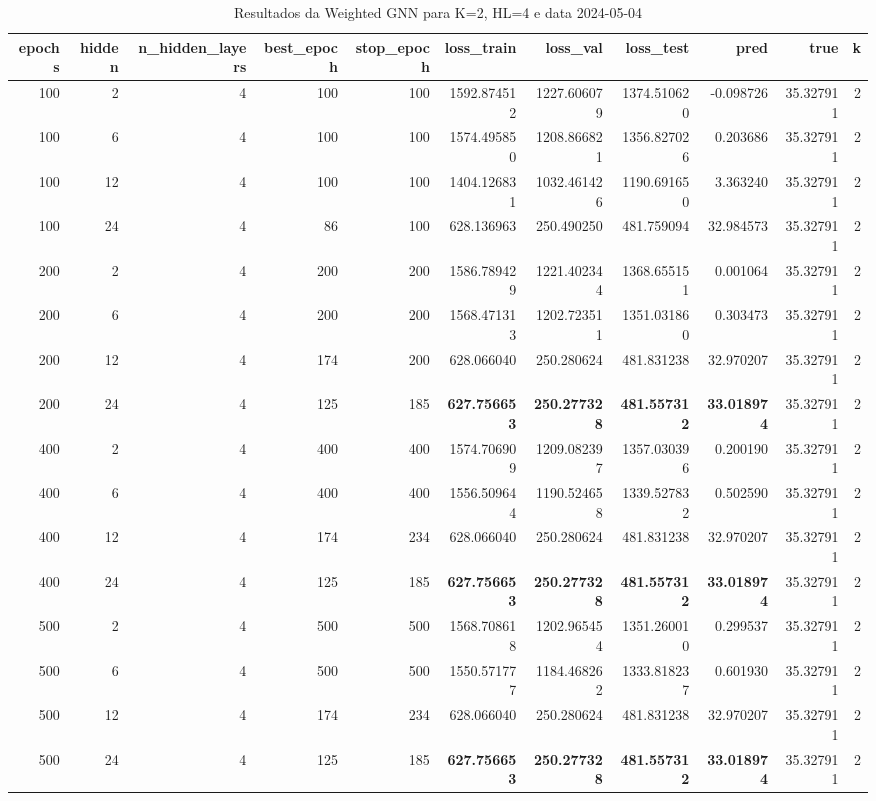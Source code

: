 \begin{table}
\caption{Resultados da Weighted GNN para K=2, HL=4 e data 2024-05-04}
\label{tab:weighted_gnn_results_k2_hl4_d20240504}
\begin{tabular}{rrrrrrrrrrr}
\toprule
epochs & hidden & n\_hidden\_layers & best\_epoch & stop\_epoch & loss\_train & loss\_val & loss\_test & pred & true & k \\
\midrule
100 & 2 & 4 & 100 & 100 & 1592.874512 & 1227.606079 & 1374.510620 & -0.098726 & 35.327911 & 2 \\
100 & 6 & 4 & 100 & 100 & 1574.495850 & 1208.866821 & 1356.827026 & 0.203686 & 35.327911 & 2 \\
100 & 12 & 4 & 100 & 100 & 1404.126831 & 1032.461426 & 1190.691650 & 3.363240 & 35.327911 & 2 \\
100 & 24 & 4 & 86 & 100 & 628.136963 & 250.490250 & 481.759094 & 32.984573 & 35.327911 & 2 \\
200 & 2 & 4 & 200 & 200 & 1586.789429 & 1221.402344 & 1368.655151 & 0.001064 & 35.327911 & 2 \\
200 & 6 & 4 & 200 & 200 & 1568.471313 & 1202.723511 & 1351.031860 & 0.303473 & 35.327911 & 2 \\
200 & 12 & 4 & 174 & 200 & 628.066040 & 250.280624 & 481.831238 & 32.970207 & 35.327911 & 2 \\
200 & 24 & 4 & 125 & 185 & \textbf{627.756653} & \textbf{250.277328} & \textbf{481.557312} & \textbf{33.018974} & 35.327911 & 2 \\
400 & 2 & 4 & 400 & 400 & 1574.706909 & 1209.082397 & 1357.030396 & 0.200190 & 35.327911 & 2 \\
400 & 6 & 4 & 400 & 400 & 1556.509644 & 1190.524658 & 1339.527832 & 0.502590 & 35.327911 & 2 \\
400 & 12 & 4 & 174 & 234 & 628.066040 & 250.280624 & 481.831238 & 32.970207 & 35.327911 & 2 \\
400 & 24 & 4 & 125 & 185 & \textbf{627.756653} & \textbf{250.277328} & \textbf{481.557312} & \textbf{33.018974} & 35.327911 & 2 \\
500 & 2 & 4 & 500 & 500 & 1568.708618 & 1202.965454 & 1351.260010 & 0.299537 & 35.327911 & 2 \\
500 & 6 & 4 & 500 & 500 & 1550.571777 & 1184.468262 & 1333.818237 & 0.601930 & 35.327911 & 2 \\
500 & 12 & 4 & 174 & 234 & 628.066040 & 250.280624 & 481.831238 & 32.970207 & 35.327911 & 2 \\
500 & 24 & 4 & 125 & 185 & \textbf{627.756653} & \textbf{250.277328} & \textbf{481.557312} & \textbf{33.018974} & 35.327911 & 2 \\

\end{tabular}
\end{table}
